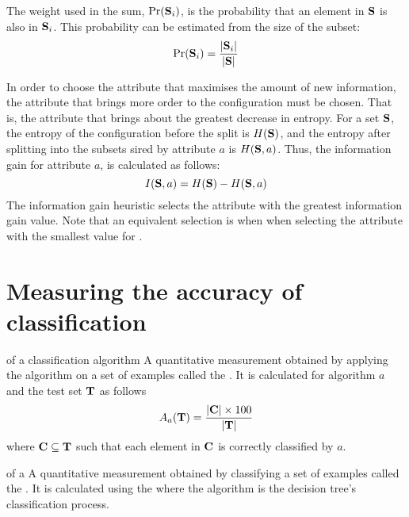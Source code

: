 The weight used in the sum, $\mbox{Pr}({\bf S}_i)$, is the probability that an element in ${\bf S}$ is also in ${\bf S}_i$.  This probability can be estimated from the size of the subset:
\begin{equation}
\mbox{Pr}({\bf S}_i) = \frac{|{\bf S}_i|}{|{\bf S}|}
\label{eq:subset_probability}
\end{equation}

In order to choose the attribute that maximises the amount of new information, the attribute that brings more order to the configuration must be chosen.  That is, the attribute that brings about the greatest decrease in entropy. For a set ${\bf S}$, the entropy of the configuration before the split is $H({\bf S})$, and the entropy after splitting into the subsets sired by attribute $a$ is $H({\bf S},a)$. Thus, the information gain for attribute $a$, is calculated as follows:
\begin{equation}
I({\bf S},a) = H({\bf S}) - H({\bf S},a)
\label{eq:gain}
\end{equation}
The information gain heuristic selects the attribute with the greatest information gain value. Note that an equivalent selection is when when selecting the attribute with the smallest value for . 

\section{Measuring the accuracy of classification}
 {of a classification algorithm} {A quantitative measurement obtained by applying the algorithm on a set of examples called the . It is calculated for algorithm $a$ and the test set ${\bf T}$ as follows
\begin{equation}
A_a({\bf T}) = \frac{|{\bf C}| \times 100}{|{\bf T}|}
\end{equation}
where ${\bf C} \subseteq {\bf T}$ such that each element in ${\bf C} $ is correctly classified by $a$.
}  

 {of a } {A quantitative measurement obtained by classifying a set of examples called the . It is calculated using the \newline {} where the algorithm is the decision tree's classification process.}  

